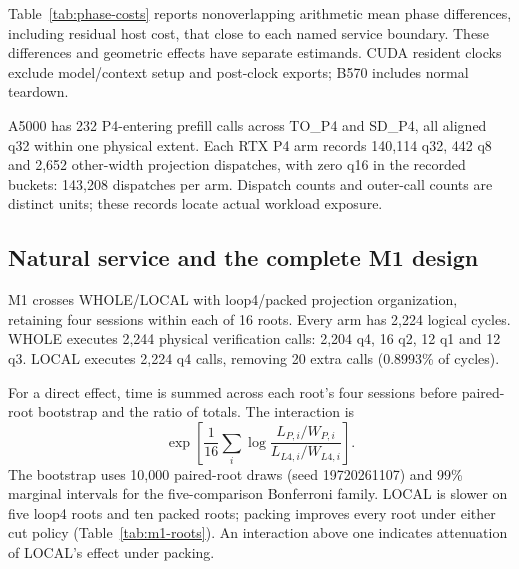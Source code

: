 Table~\ref{tab:phase-costs} reports nonoverlapping arithmetic mean phase differences, including residual host cost, that close to each named service boundary. These differences and geometric effects have separate estimands. CUDA resident clocks exclude model/context setup and post-clock exports; B570 includes normal teardown.


A5000 has 232 P4-entering prefill calls across TO\_P4 and SD\_P4, all aligned q32 within one physical extent. Each RTX P4 arm records 140,114 q32, 442 q8 and 2,652 other-width projection dispatches, with zero q16 in the recorded buckets: 143,208 dispatches per arm. Dispatch counts and outer-call counts are distinct units; these records locate actual workload exposure.

\FloatBarrier
\subsection{Natural service and the complete M1 design}
\label{supp:natural}
M1 crosses WHOLE/LOCAL with loop4/packed projection organization, retaining four sessions within each of 16 roots. Every arm has 2,224 logical cycles. WHOLE executes 2,244 physical verification calls: 2,204 q4, 16 q2, 12 q1 and 12 q3. LOCAL executes 2,224 q4 calls, removing 20 extra calls (0.8993\% of cycles).


For a direct effect, time is summed across each root's four sessions before paired-root bootstrap and the ratio of totals. The interaction is
\[
 \exp\!\left[\frac{1}{16}\sum_i\log
 \frac{L_{P,i}/W_{P,i}}{L_{L4,i}/W_{L4,i}}\right].
\]
The bootstrap uses 10,000 paired-root draws (seed 19720261107) and 99\% marginal intervals for the five-comparison Bonferroni family. LOCAL is slower on five loop4 roots and ten packed roots; packing improves every root under either cut policy (Table~\ref{tab:m1-roots}). An interaction above one indicates attenuation of LOCAL's effect under packing.


